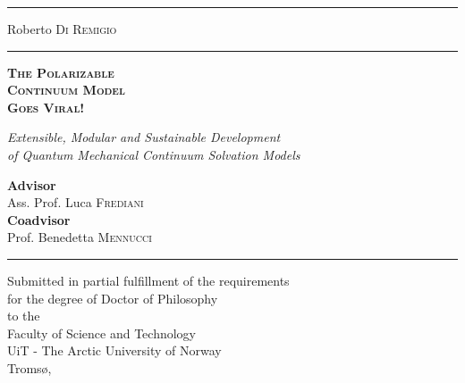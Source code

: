 
\newfontfamily{}
\begin{titlepage}
  \begingroup%
  \textheight
  \begin{minipage}[t]{0.05\textwidth}
    \color{brewerBlue}
    \rule{6pt}{\textheight}
  \end{minipage}
  \hspace{0.05\textwidth}
  \begin{minipage}[t]{0.8\textwidth}
    \vspace*{0.5\drop}
    {\LARGE Roberto \textsc{Di Remigio}} \\
    \rule{\textwidth}{1pt} \par
    \vspace{3\baselineskip}
    {\noindent\Cinzel\bfseries\scshape\Huge\color{brewerBlue}
    The Polarizable \\ Continuum Model \\ Goes Viral!} \par
    \vspace{2\baselineskip}
    {\Large\itshape Extensible, Modular and Sustainable Development
    \\
    of Quantum Mechanical Continuum Solvation Models} \par
    \vspace{6.5\baselineskip}
    {
    \large \textbf{Advisor}
    \\
    Ass. Prof. Luca \textsc{Frediani}
    \\[0.1\drop]
    \textbf{Coadvisor}
    \\
    Prof. Benedetta \textsc{Mennucci}
    } \par
    \vspace{\baselineskip}
    \rule{\textwidth}{1pt} \par
    {\small\itshape
    \begin{center}
      Submitted in partial fulfillment of the requirements
      \\
      for the degree of Doctor of Philosophy
      \\[0.1\drop]
      \textnormal{to the}
      \\[0.1\drop]
      Faculty of Science and Technology
      \\
      UiT - The Arctic University of Norway
      \\
      Tromsø, \myTime
    \end{center}
    }
  \end{minipage}
  \endgroup
\end{titlepage}
\restoregeometry
